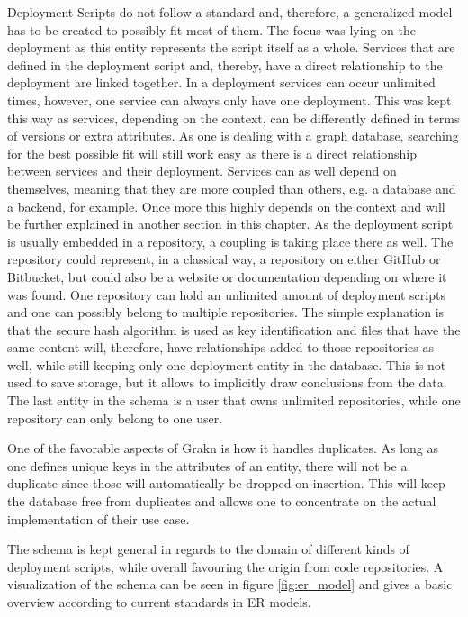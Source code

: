 Deployment Scripts do not follow a standard and, therefore, a generalized model has to be created to possibly fit most of them. The focus was lying on the deployment as this entity represents the script itself as a whole. Services that are defined in the deployment script and, thereby, have a direct relationship to the deployment are linked together. In a deployment services can occur unlimited times, however, one service can always only have one deployment. This was kept this way as services, depending on the context, can be differently defined in terms of versions or extra attributes. As one is dealing with a graph database, searching for the best possible fit will still work easy as there is a direct relationship between services and their deployment.
Services can as well depend on themselves, meaning that they are more coupled than others, e.g. a database and a backend, for example. Once more this highly depends on the context and will be further explained in another section in this chapter. 
As the deployment script is usually embedded in a repository, a coupling is taking place there as well. The repository could represent, in a classical way, a repository on either GitHub or Bitbucket, but could also be a website or documentation depending on where it was found. One repository can hold an unlimited amount of deployment scripts and one can possibly belong to multiple repositories. The simple explanation is that the secure hash algorithm is used as key identification and files that have the same content will, therefore, have relationships added to those repositories as well, while still keeping only one deployment entity in the database. This is not used to save storage, but it allows to implicitly draw conclusions from the data. The last entity in the schema is a user that owns unlimited repositories, while one repository can only belong to one user.

One of the favorable aspects of Grakn is how it handles duplicates. As long as one defines unique keys in the attributes of an entity, there will not be a duplicate since those will automatically be dropped on insertion. This will keep the database free from duplicates and allows one to concentrate on the actual implementation of their use case.

The schema is kept general in regards to the domain of different kinds of deployment scripts, while overall favouring the origin from code repositories. A visualization of the schema can be seen in figure \ref{fig:er_model} and gives a basic overview according to current standards in ER models.


